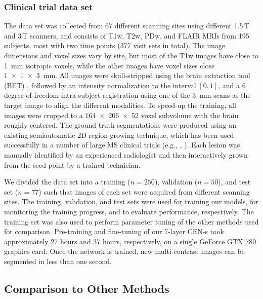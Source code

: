 \subsubsection{Clinical trial data set}

The data set was collected from 67 different scanning sites using different
1.5\,T and 3\,T scanners, and consists of T1w, T2w, PDw, and FLAIR MRIs from 195
subjects, most with two time points (377 visit sets in total). The image
dimensions and voxel sizes vary by site, but most of the T1w images have close
to \SI{1}{\milli\meter} isotropic voxels, while the other images have voxel
sizes close \SI{1x1x3}{\milli\meter}.
All images were skull-stripped using the brain extraction tool (BET)
\cite{jenkinson2005bet2}, followed by an intensity normalization to the interval
$[0,1]$, and a 6 degree-of-freedom intra-subject registration using one of the
\SI{3}{\milli\meter} scans as the target image to align the different
modalities. To speed-up the training, all images were cropped to a
\num{164x206x52} voxel subvolume with the brain roughly centered. The ground
truth segmentations were produced using an existing semiautomatic 2D
region-growing technique, which has been used successfully in a number of large
MS clinical trials (e.g., \cite{kappos2006long},
\cite{traboulsee2008reduction}). Each lesion was manually identified by an
experienced radiologist and then interactively grown from the seed point by a
trained technician.

We divided the data set into a training ($n=250$), validation ($n=50$), and test
set ($n=77$) such that images of each set were acquired from different scanning
sites. The training, validation, and test sets were used for training our
models, for monitoring the training progress, and to evaluate performance,
respectively. The training set was also used to perform parameter tuning of the
other methods used for comparison. Pre-training and fine-tuning of our 7-layer
CEN-s took approximately 27 hours and 37 hours, respectively, on a single
GeForce GTX 780 graphics card. Once the network is trained, new multi-contrast
images can be segmented in less than one second.


\subsection{Comparison to Other Methods}

